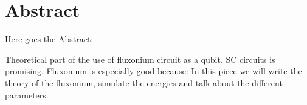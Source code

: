 \chapter*{Abstract}

Here goes the Abstract: 

Theoretical part of the use of fluxonium circuit as a qubit. 
SC circuits is promising. 
Fluxonium is especially good because: 
In this piece we will write the theory of the fluxonium, simulate the energies and talk about the different parameters. 